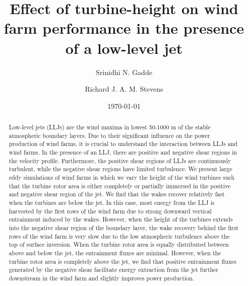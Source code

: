 \documentclass[%
 aip,
 amsmath,amssymb,
preprint,%
author-numerical,%
]{revtex4-1}
\begin{document}

\title[LLJ \& shear]{Effect of turbine-height on wind farm performance in the presence of a low-level jet}

\author{Srinidhi N. Gadde}
\author{Richard J. A. M. Stevens}%

\date{\today}%

\begin{abstract}
Low-level jets (LLJs) are the wind maxima in lowest 50-1000 m of the stable atmospheric boundary layers. Due to their significant influence on the power production of wind farms, it is crucial to understand the interaction between LLJs and wind farms. In the presence of an LLJ, there are positive and negative shear regions in the velocity profile. Furthermore, the positive shear regions of LLJs are continuously turbulent, while the negative shear regions have limited turbulence. We present large eddy simulations of wind farms in which we vary the height of the wind turbines such that the turbine rotor area is either completely or partially immersed in the positive and negative shear region of the jet. We find that the wakes recover relatively fast when the turbines are below the jet. In this case, most energy from the LLJ is harvested by the first rows of the wind farm due to strong downward vertical entrainment induced by the wakes. However, when the height of the turbines extends into the negative shear region of the boundary layer, the wake recovery behind the first rows of the wind farm is very slow due to the low atmospheric turbulence above the top of surface inversion. When the turbine rotor area is equally distributed between above and below the jet, the entrainment fluxes are minimal. However, when the turbine rotor area is completely above the jet, we find that positive entrainment fluxes generated by the negative shear facilitate energy extraction from the jet further downstream in the wind farm and slightly improves power production.
\end{abstract}
\end{document}
